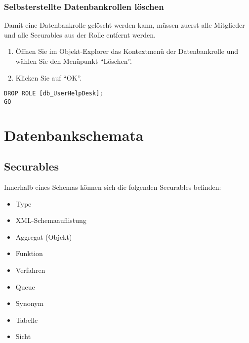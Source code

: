         \subsubsection{Selbsterstellte Datenbankrollen löschen}
          Damit eine Datenbankrolle gelöscht werden kann, müssen zuerst alle
          Mitglieder und alle Securables aus der Rolle entfernt werden.
          \begin{enumerate}
            \item Öffnen Sie im Objekt-Explorer das Kontextmenü der
            Datenbankrolle und wählen Sie den Menüpunkt \enquote{Löschen}.
            \item Klicken Sie auf \enquote{OK}.
          \end{enumerate}
          \begin{lstlisting}[language=ms_sql,caption={Entfernen einer
          Datebankrolle},label=sql19_12]
DROP ROLE [db_UserHelpDesk];
GO
          \end{lstlisting}
          \begin{literaturinternet}
            \item \cite{ms174988}
          \end{literaturinternet}
    \section{Datenbankschemata}
      \subsection{Securables}
        Innerhalb eines Schemas können sich die folgenden Securables befinden:
        \begin{itemize}
          \item Type 
          \item XML-Schemaauflistung
          \item Aggregat (Objekt)
          \item Funktion
          \item Verfahren
          \item Queue 
          \item Synonym
          \item Tabelle
          \item Sicht
        \end{itemize}
        \begin{literaturinternet}
          \item \cite{ms190401}
        \end{literaturinternet}
